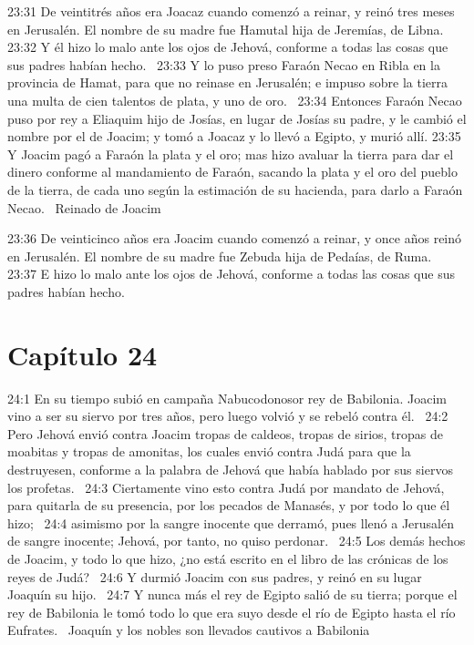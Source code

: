23:31 De veintitrés años era Joacaz cuando comenzó a reinar, y reinó tres meses en Jerusalén. El nombre de su madre fue Hamutal hija de Jeremías, de Libna.  
23:32 Y él hizo lo malo ante los ojos de Jehová, conforme a todas las cosas que sus padres habían hecho.  
23:33 Y lo puso preso Faraón Necao en Ribla en la provincia de Hamat, para que no reinase en Jerusalén; e impuso sobre la tierra una multa de cien talentos de plata, y uno de oro.  
23:34 Entonces Faraón Necao puso por rey a Eliaquim hijo de Josías, en lugar de Josías su padre, y le cambió el nombre por el de Joacim; y tomó a Joacaz y lo llevó a Egipto, y murió allí. 
23:35 Y Joacim pagó a Faraón la plata y el oro; mas hizo avaluar la tierra para dar el dinero conforme al mandamiento de Faraón, sacando la plata y el oro del pueblo de la tierra, de cada uno según la estimación de su hacienda, para darlo a Faraón Necao.  
Reinado de Joacim  

23:36 De veinticinco años era Joacim cuando comenzó a reinar, y once años reinó en Jerusalén. El nombre de su madre fue Zebuda hija de Pedaías, de Ruma.  
23:37 E hizo lo malo ante los ojos de Jehová, conforme a todas las cosas que sus padres habían hecho.  
\section*{Capítulo 24 }

24:1 En su tiempo subió en campaña Nabucodonosor rey de Babilonia. Joacim vino a ser su siervo por tres años, pero luego volvió y se rebeló contra él.  
24:2 Pero Jehová envió contra Joacim tropas de caldeos, tropas de sirios, tropas de moabitas y tropas de amonitas, los cuales envió contra Judá para que la destruyesen, conforme a la palabra de Jehová que había hablado por sus siervos los profetas.  
24:3 Ciertamente vino esto contra Judá por mandato de Jehová, para quitarla de su presencia, por los pecados de Manasés, y por todo lo que él hizo;  
24:4 asimismo por la sangre inocente que derramó, pues llenó a Jerusalén de sangre inocente; Jehová, por tanto, no quiso perdonar.  
24:5 Los demás hechos de Joacim, y todo lo que hizo, ¿no está escrito en el libro de las crónicas de los reyes de Judá?  
24:6 Y durmió Joacim con sus padres, y reinó en su lugar Joaquín su hijo.  
24:7 Y nunca más el rey de Egipto salió de su tierra; porque el rey de Babilonia le tomó todo lo que era suyo desde el río de Egipto hasta el río Eufrates.  
Joaquín y los nobles son llevados cautivos a Babilonia  

